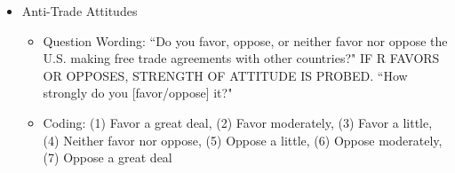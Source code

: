 \begin{itemize}
		
	\item Anti-Trade Attitudes
		\begin{itemize}
			\item Question Wording: ``Do you favor, oppose, or neither favor nor oppose the U.S. making free trade agreements with other countries?" IF  R FAVORS OR OPPOSES, STRENGTH OF ATTITUDE IS PROBED. ``How strongly do you [favor/oppose] it?"
			\item Coding: (1) Favor a great deal, (2) Favor moderately, (3) Favor a little, (4) Neither favor nor oppose, (5) Oppose a little, (6) Oppose moderately, (7) Oppose a great deal
		\end{itemize}
		

\end{itemize}

